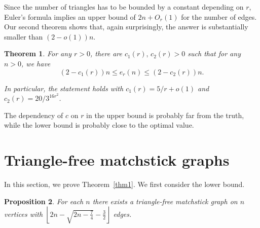 \documentclass[12pt]{article}
\theoremstyle{plain}
\newtheorem{theorem}{Theorem}
\newtheorem{proposition}[theorem]{Proposition}
\theoremstyle{definition}
\theoremstyle{remark}
\begin{document}
Since the number of triangles has to be bounded by a constant depending on $r$, Euler's formula implies an upper bound of $2n+O_r(1)$ for the number of edges. Our second theorem shows that, again surprisingly, the answer is substantially
smaller than $(2-o(1))n$.

\begin{theorem}\label{boundedmatchstick}
For any $r>0$, there are $c_1(r), \, c_2(r)>0$ such that for any $n>0$, we have
\[\left(2-c_1(r)\right)n\le e_r(n)\le \left(2-c_2(r)\right)n.\]

In particular, the statement holds with 
$c_1(r)=5/r+o(1)$ and $c_2(r)=20/3^{16r^2}$.
\end{theorem} 

The dependency of $c$ on $r$ in the upper bound is probably far from the truth, while the lower bound is probably close to the optimal value.


\section{Triangle-free matchstick graphs}
In this section, we prove Theorem~\ref{thm1}.
We first consider the lower bound.


\begin{proposition}\label{prop:triangle-free-lower-bound}
For each $n$ there exists a triangle-free matchstick graph on $n$ vertices with $\left\lfloor 2n-\sqrt{2n-\frac{7}{4}}-\frac{3}{2}\right\rfloor$ edges.
\end{proposition}
\end{document}
